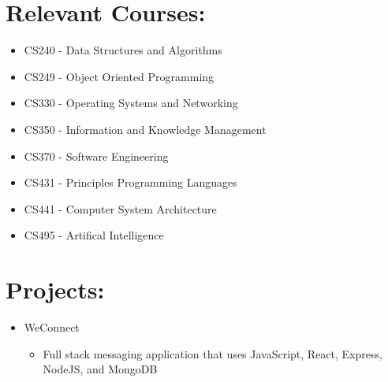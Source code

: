 \documentclass[12pt, oneside, a4paper]{article}
\begin{document}
    \section*{Relevant Courses:}
    \begin{itemize}
        \item CS240 - Data Structures and Algorithms
        \item CS249 - Object Oriented Programming
        \item CS330 - Operating Systems and Networking
        \item CS350 - Information and Knowledge Management
        \item CS370 - Software Engineering
        \item CS431 - Principles Programming Languages
        \item CS441 - Computer System Architecture
        \item CS495 - Artifical Intelligence
    \end{itemize}

    \section*{Projects:}
    \begin{itemize}
        \item WeConnect
            \begin{itemize}
                \item Full stack messaging application that uses JavaScript, React, Express, NodeJS, and MongoDB
            \end{itemize}
    \end{itemize}
\end{document}
